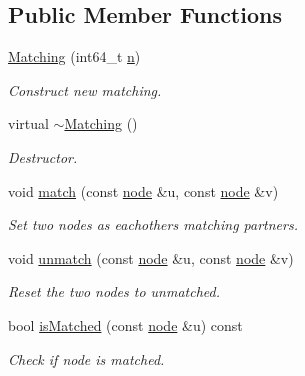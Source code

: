 \subsection*{Public Member Functions}
\begin{DoxyCompactItemize}
\item 
\hyperlink{class_ensemble_clustering_1_1_matching_a5e1de8d09e758fae48909c25484b42b7}{Matching} (int64\-\_\-t \hyperlink{class_ensemble_clustering_1_1_index_map_a3151d302c54e6ad0175bd87aef62d4ca}{n})
\begin{DoxyCompactList}\small\item\em Construct new matching. \end{DoxyCompactList}\item 
virtual \hyperlink{class_ensemble_clustering_1_1_matching_abcc136cf0a7e0b0f2364f2d1b3eb1f2c}{$\sim$\-Matching} ()
\begin{DoxyCompactList}\small\item\em Destructor. \end{DoxyCompactList}\item 
void \hyperlink{class_ensemble_clustering_1_1_matching_a41f6ed1f3b1660fb682c32cf2ade11de}{match} (const \hyperlink{namespace_ensemble_clustering_ae829290aeccd1a420b17a37fd901f114}{node} \&u, const \hyperlink{namespace_ensemble_clustering_ae829290aeccd1a420b17a37fd901f114}{node} \&v)
\begin{DoxyCompactList}\small\item\em Set two nodes as eachothers matching partners. \end{DoxyCompactList}\item 
void \hyperlink{class_ensemble_clustering_1_1_matching_a214fd9e80cb5842f87e2ec909655b5e2}{unmatch} (const \hyperlink{namespace_ensemble_clustering_ae829290aeccd1a420b17a37fd901f114}{node} \&u, const \hyperlink{namespace_ensemble_clustering_ae829290aeccd1a420b17a37fd901f114}{node} \&v)
\begin{DoxyCompactList}\small\item\em Reset the two nodes to unmatched. \end{DoxyCompactList}\item 
bool \hyperlink{class_ensemble_clustering_1_1_matching_a6591583cd8dcd8ddc702cdbddcc42bd0}{is\-Matched} (const \hyperlink{namespace_ensemble_clustering_ae829290aeccd1a420b17a37fd901f114}{node} \&u) const 
\begin{DoxyCompactList}\small\item\em Check if node is matched. \end{DoxyCompactList}\item 

\end{DoxyCompactItemize}
